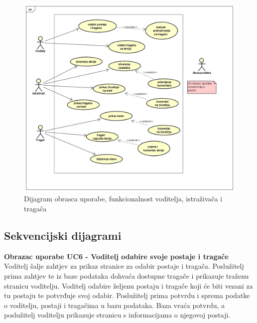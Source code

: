 				\begin{figure}[H]
					\includegraphics[scale=0.5]{slike/dijagram2.PNG} %
					\centering
					\caption{Dijagram obrasca uporabe, funkcionalnost voditelja, istraživača i tragača}
					\label{fig:dijagram2} %
				\end{figure}
				
			\subsection{Sekvencijski dijagrami}
				
				\noindent \textbf{Obrazac uporabe UC6 - Voditelj odabire svoje postaje i tragače}\\
				
				\noindent Voditelj šalje zahtjev za prikaz stranice za odabir postaje i tragača. Poslužitelj prima zahtjev te iz baze podataka dohvaća dostupne tragače i prikazuje traženu stranicu voditelju. Voditelj odabire željenu postaju i tragače koji će biti vezani za tu postaju te potvrđuje svoj odabir. Poslužitelj prima potvrdu i sprema podatke o voditelju, postaji i tragačima u bazu podataka. Baza vraća potvrdu, a poslužitelj voditelju prikazuje stranicu s informacijama o njegovoj postaji.
				
